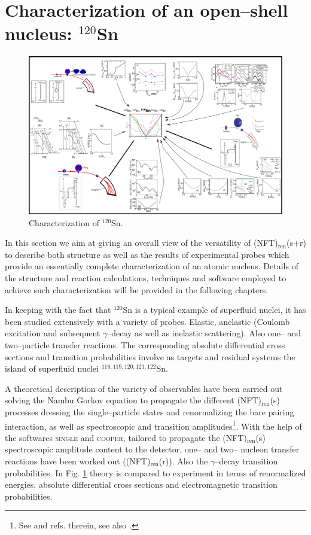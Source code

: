 \section{Characterization of an open--shell nucleus: $^{120}$Sn}\label{S1.10}
          \begin{figure}
          \centerline {
          \includegraphics*[width=24cm, angle=90]{introduccion/figs/fig1_4_1}}
          \caption{Characterization of $^{120}$Sn.}
          \label{fig1.4.1}
          \end{figure}
          In this section we aim at giving an overall view of
the versatility of (NFT)$_{\text{ren}}$(s+r) to describe both structure as well as the results of experimental probes which provide an essentially complete characterization of an atomic nucleus. Details of the structure and reaction calculations, techniques and software employed to achieve such characterization will be provided in the following chapters. 


In keeping with the fact that $^{120}$Sn is a 
 typical example of superfluid nuclei, it has been studied extensively with a variety of probes.  Elastic, anelastic (Coulomb excitation and subsequent $\gamma$--decay as well as inelastic scattering). Also one-- and two--particle transfer reactions. The corresponding absolute differential cross sections and transition probabilities  involve as targets and residual systems the island of superfluid nuclei $^{118,119,120,121,122}$Sn.
 
 
  A theoretical description of the variety of observables  have been carried out  solving the Nambu Gorkov equation to propagate the different  (NFT)$_{\text{ren}}$(s) processes dressing the single--particle states and renormalizing the bare pairing interaction, as well as spectroscopic and transition amplitudes\footnote{See \cite{Idini:15} and refs. therein, see also \cite{Broglia:16}.}. With the help of the softwares \textsc{single} and \textsc{cooper}, tailored to propagate the (NFT)$_{\text{ren}}$(s) spectroscopic amplitude content to the detector, one-- and two-- nucleon transfer reactions have been worked out ((NFT)$_{\text{ren}}$(r)). Also the $\gamma$--decay transition probabilities. In Fig. \ref{fig1.4.1} theory is compared to experiment in terms of renormalized energies, absolute differential cross sections and electromagnetic transition probabilities. 
  
